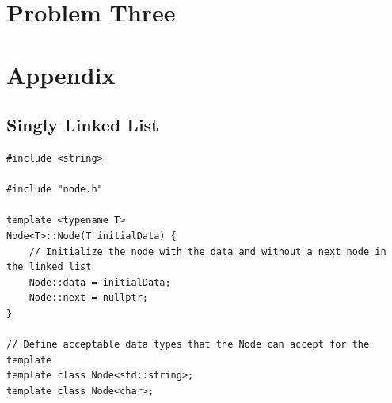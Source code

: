 \documentclass[letterpaper, 10pt,DIV=13]{scrartcl}
\numberwithin{equation}{section} %
\numberwithin{figure}{section} %
\numberwithin{table}{section} %
\begin{document}
\section{Problem Three}


\pagebreak


 

\pagebreak


\section{Appendix}
\lstset{numbers=left, numberstyle=\tiny, stepnumber=1, numbersep=5pt, basicstyle=\footnotesize\ttfamily}

\subsection{Singly Linked List}\label{nodeListing}
\begin{lstlisting}[frame=single, ]  
#include <string>

#include "node.h"

template <typename T>
Node<T>::Node(T initialData) {
    // Initialize the node with the data and without a next node in the linked list
    Node::data = initialData;
    Node::next = nullptr;
}

// Define acceptable data types that the Node can accept for the template
template class Node<std::string>;
template class Node<char>;
\end{lstlisting}
\end{document}
